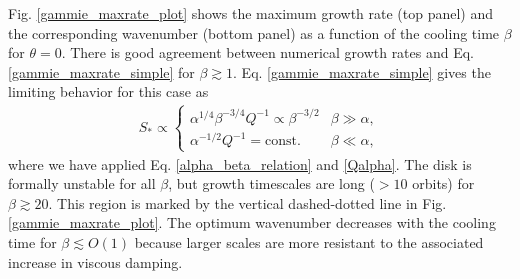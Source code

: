Fig. \ref{gammie_maxrate_plot} shows the maximum
growth rate (top panel) and the corresponding wavenumber (bottom
panel) as a function of the cooling time $\beta$ for $\theta=0$.  
There is good agreement between numerical growth rates and
Eq. \ref{gammie_maxrate_simple} for $\beta \gtrsim 1$. 
Eq. \ref{gammie_maxrate_simple} gives the
limiting behavior for this case as   
\begin{align*}
  S_*\propto \begin{cases}
    \alpha^{1/4}\beta^{-3/4}Q^{-1}\propto \beta^{-3/2} 
    &  \beta \gg \alpha, \\
    \alpha^{-1/2}Q^{-1} = \mathrm{const.} & \beta \ll \alpha,    
  \end{cases}
\end{align*}
where we have applied Eq. \ref{alpha_beta_relation}
and \ref{Qalpha}. The disk is formally unstable for all $\beta$, but
growth timescales are long ($>10$ orbits) for $\beta \gtrsim
20$. %
This region is marked by the vertical dashed-dotted line in
Fig. \ref{gammie_maxrate_plot}. The optimum wavenumber decreases with
the cooling time for $\beta\lesssim O(1)$ because larger scales are
more resistant to the associated increase in viscous damping.      

